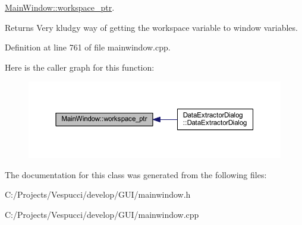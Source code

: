 \hyperlink{class_main_window_af78d7dca13e15077306eb27737edb096}{Main\+Window\+::workspace\+\_\+ptr}. 

\begin{DoxyReturn}{Returns}
Very kludgy way of getting the workspace variable to window variables. 
\end{DoxyReturn}


Definition at line 761 of file mainwindow.\+cpp.



Here is the caller graph for this function\+:\nopagebreak
\begin{figure}[H]
\begin{center}
\leavevmode
\includegraphics[width=350pt]{class_main_window_af78d7dca13e15077306eb27737edb096_icgraph}
\end{center}
\end{figure}




The documentation for this class was generated from the following files\+:\begin{DoxyCompactItemize}
\item 
C\+:/\+Projects/\+Vespucci/develop/\+G\+U\+I/mainwindow.\+h\item 
C\+:/\+Projects/\+Vespucci/develop/\+G\+U\+I/mainwindow.\+cpp\end{DoxyCompactItemize}
